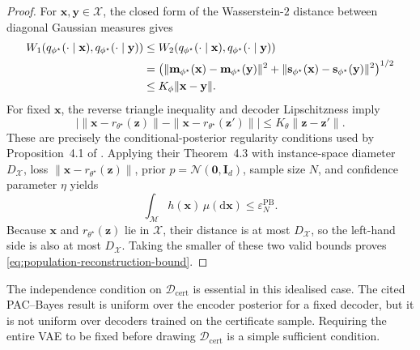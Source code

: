 \documentclass[pdflatex,sn-mathphys-num]{sn-jnl}%
\theoremstyle{thmstyleone}%
\theoremstyle{thmstyletwo}%
\theoremstyle{thmstylethree}%
\begin{document}
\begin{appendices}
\begin{proof}
For $\mathbf{x},\mathbf{y}\in\mathcal{X}$, the closed form of the Wasserstein-$2$ distance between diagonal Gaussian measures gives
\begin{align}
  W_1\!\left(q_{\phi^\star}(\cdot\mid\mathbf{x}),
             q_{\phi^\star}(\cdot\mid\mathbf{y})\right)
  &\leq
  W_2\!\left(q_{\phi^\star}(\cdot\mid\mathbf{x}),
             q_{\phi^\star}(\cdot\mid\mathbf{y})\right)
  \notag\\
  &=\left(
      \|\mathbf{m}_{\phi^\star}(\mathbf{x})
        -\mathbf{m}_{\phi^\star}(\mathbf{y})\|^2
      +\|\mathbf{s}_{\phi^\star}(\mathbf{x})
        -\mathbf{s}_{\phi^\star}(\mathbf{y})\|^2
    \right)^{1/2}
  \notag\\
  &\leq K_\phi\|\mathbf{x}-\mathbf{y}\|.
  \label{eq:encoder-wasserstein-lipschitz}
\end{align}
For fixed $\mathbf{x}$, the reverse triangle inequality and decoder Lipschitzness imply
\begin{equation}
  \left|
    \|\mathbf{x}-r_{\theta^\star}(\mathbf{z})\|
    -\|\mathbf{x}-r_{\theta^\star}(\mathbf{z}')\|
  \right|
  \leq K_\theta\|\mathbf{z}-\mathbf{z}'\|.
  \label{eq:reconstruction-loss-lipschitz}
\end{equation}
These are precisely the conditional-posterior regularity conditions used by Proposition~4.1 of \cite{mbacke2023statisticalguaranteesvariationalautoencoders}.  Applying their Theorem~4.3 with instance-space diameter $D_{\mathcal{X}}$, loss $\|\mathbf{x}-r_{\theta^\star}(\mathbf{z})\|$, prior $p=\mathcal{N}(\mathbf{0},\mathbf{I}_d)$, sample size $N$, and confidence parameter $\eta$ yields
\begin{equation}
  \int_{\mathcal{M}}h(\mathbf{x})\,\mu(\mathrm d\mathbf{x})
  \leq \varepsilon_N^{\mathrm{PB}}.
  \label{eq:mbacke-specialization}
\end{equation}
Because $\mathbf{x}$ and $r_{\theta^\star}(\mathbf{z})$ lie in $\mathcal{X}$, their distance is at most $D_{\mathcal{X}}$, so the left-hand side is also at most $D_{\mathcal{X}}$.  Taking the smaller of these two valid bounds proves \eqref{eq:population-reconstruction-bound}.
\end{proof}

The independence condition on $\mathcal{D}_{\mathrm{cert}}$ is essential in this idealised case.  The cited PAC--Bayes result is uniform over the encoder posterior for a fixed decoder, but it is not uniform over decoders trained on the certificate sample.  Requiring the entire VAE to be fixed before drawing $\mathcal{D}_{\mathrm{cert}}$ is a simple sufficient condition.


\end{appendices}
\end{document}
